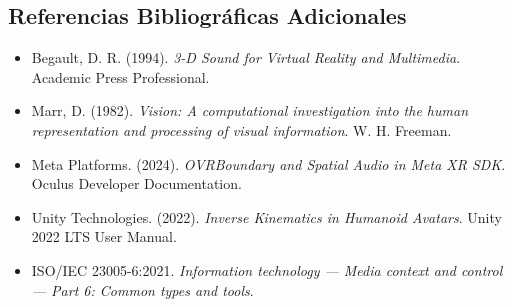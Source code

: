 \subsection{Referencias Bibliográficas Adicionales}
\begin{itemize}[label={},leftmargin=0pt,itemsep=5pt]
  \item Begault, D. R. (1994). \emph{3-D Sound for Virtual Reality and Multimedia}. Academic Press Professional.
  \item Marr, D. (1982). \emph{Vision: A computational investigation into the human representation and processing of visual information}. W. H. Freeman.
  \item Meta Platforms. (2024). \emph{OVRBoundary and Spatial Audio in Meta XR SDK}. Oculus Developer Documentation.
  \item Unity Technologies. (2022). \emph{Inverse Kinematics in Humanoid Avatars}. Unity 2022 LTS User Manual.
  \item ISO/IEC 23005-6:2021. \emph{Information technology --- Media context and control --- Part 6: Common types and tools}.
\end{itemize}
